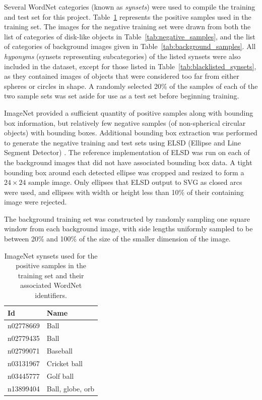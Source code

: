 \documentclass{sig-alternate-05-2015}
\newcommand{\newterm}[1]{{\textit{#1}}}
\newcommand{\citep}[1]{\cite{#1}}
\begin{document}
{{			Several WordNet categories (known as \newterm{synsets}) were used to compile the training and test set for this project. Table~\ref{tab:positive_samples} represents the positive samples used in the training set. The images for the negative training set were drawn from both the list of categories of disk-like objects in Table~\ref{tab:negative_samples}, and the list of categories of background images given in Table~\ref{tab:background_samples}.
      All \newterm{hyponyms} (synsets representing subcategories) of the listed synsets were also included in the dataset, except for those listed in Table~\ref{tab:blacklisted_synsets}, as they contained images of objects that were considered too far from either spheres or circles in shape.
      A randomly selected 20\% of the samples of each of the two sample sets was set aside for use as a test set before beginning training.

      ImageNet provided a sufficient quantity of positive samples along with bounding box information, but relatively few negative samples (of non-spherical circular objects) with bounding boxes. Additional bounding box extraction was performed to generate the negative training and test sets using ELSD (Ellipse and Line Segment Detector) \citep{Patraucean:2012jf}. The reference implementation of ELSD was run on each of the background images that did not have associated bounding box data. A tight bounding box around each detected ellipse was cropped and resized to form a \(24\times24\) sample image. Only ellipses that ELSD output to SVG as closed arcs were used, and ellipses with width or height less than 10\% of their containing image were rejected.

      The background training set was constructed by randomly sampling one square window from each background image, with side lengths uniformly sampled to be between 20\% and 100\% of the size of the smaller dimension of the image.

			\begin{table}
				\centering
				\caption{ImageNet synsets used for the positive samples in the training set and their associated WordNet identifiers.}
				\label{tab:positive_samples}
				\begin{tabularx}{1.0\columnwidth}{@{}lX@{}}
					\toprule
					\textbf{Id} & \textbf{Name} \\
					\midrule
						n02778669 & Ball \\
						n02779435 & Ball \\
						n02799071 & Baseball \\
						n03131967 & Cricket ball \\
						n03445777 & Golf ball \\
						n13899404 & Ball, globe, orb \\
					\bottomrule
				\end{tabularx}
			\end{table}

}}
\end{document}
